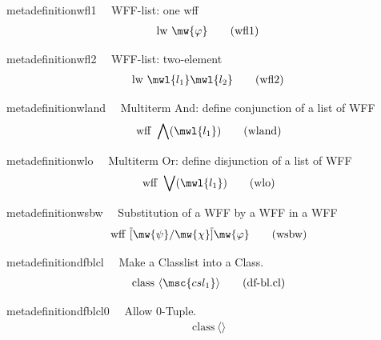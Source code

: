 \begin{restatable}{metadefinition}{wfl1}~~ WFF-list:  one wff
\begin{align}
\mathrm{lw}~ \mw{\varphi}\label{eq:wfl1}\tag{wfl1}
\end{align}
\end{restatable}

\begin{restatable}{metadefinition}{wfl2}~~ WFF-list: two-element
\begin{align}
\mathrm{lw}~ \mwl{l_1} \mwl{l_2}\label{eq:wfl2}\tag{wfl2}
\end{align}
\end{restatable}

\begin{restatable}{metadefinition}{wland}~~ Multiterm And:  define conjunction of a
list of WFF
\begin{align}
\,\mathrm{wff}~ \bigwedge( \mwl{l_1} )\label{eq:wland}\tag{wland}
\end{align}
\end{restatable}

\begin{restatable}{metadefinition}{wlo}~~ Multiterm Or:  define disjunction of a list
of WFF
\begin{align}
\,\mathrm{wff}~ \bigvee( \mwl{l_1} )\label{eq:wlo}\tag{wlo}
\end{align}
\end{restatable}

\begin{restatable}{metadefinition}{wsbw}~~ Substitution of a WFF by a WFF in a WFF
\begin{align}
\,\mathrm{wff}~ \overline{[} \mw{\psi} / \mw{\chi} \overline{]}
    \mw{\varphi}\label{eq:wsbw}\tag{wsbw}
\end{align}
\end{restatable}

\begin{restatable}{metadefinition}{dfblcl}~~ Make a Classlist into a Class.
\begin{align}
\,\mathrm{class}~ \langle \msc{csl_1} \rangle\label{eq:df-bl.cl}\tag{df-bl.cl}
\end{align}
\end{restatable}

\begin{restatable}{metadefinition}{dfblcl0}~~ Allow 0-Tuple.
\begin{align}
\,\mathrm{class}~ \langle \rangle\label{eq:df-bl.cl0}\tag{df-bl.cl0}
\end{align}
\end{restatable}

